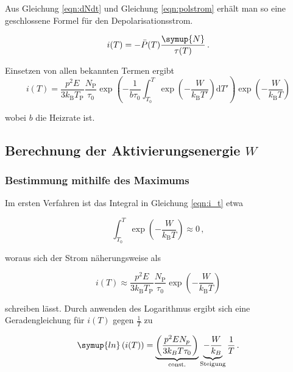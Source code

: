 Aus Gleichung \eqref{eqn:dNdt} und Gleichung \eqref{eqn:polstrom} erhält man so eine geschlossene Formel für den Depolarisationsstrom.

\begin{equation}
    i(T) = -\bar{P}(T) \frac{\symup{N}}{\tau(T)}\,.
\end{equation}

Einsetzen von allen bekannten Termen ergibt
\begin{equation}
    i(T) = \frac{ p^2 E }{ 3 k_\mathrm{B} T_\mathrm{P} } \frac{ N_\mathrm{P} }{ \tau_0 } \exp{ \left( - \frac{ 1 }{ b \tau_0 }
    \int_{T_0}^T \exp{ \left( - \frac{ W }{ k_\mathrm{B} T' } \right) \mathrm{d}T' } \right) } \exp{
    \left( -\frac{ W }{ k_\mathrm{B} T } \right) }
    \label{eqn:i_t}
\end{equation}

wobei $b$ die Heizrate ist.

\subsection{Berechnung der Aktivierungsenergie $W$}
\label{sub:W_A}
\subsubsection{Bestimmung mithilfe des Maximums}

Im ersten Verfahren ist das Integral in Gleichung \eqref{eqn:i_t} etwa

\begin{equation*}
    \int_{T_0}^T \exp{ \left( - \frac{ W }{ k_\mathrm{B} T } \right )} \approx 0 \,,
\end{equation*}

woraus sich der Strom näherungsweise als

\begin{equation}
    \label{eqn:approx}
    i(T) \approx \frac{ p^2 E }{ 3 k_\mathrm{B} T_\mathrm{P} } \frac{ N_\mathrm{P} }{ \tau_0 } \exp{ \left( - \frac{ W }{ k_\mathrm{B} T}
    \right ) }
\end{equation}

schreiben lässt.
Durch anwenden des Logarithmus ergibt sich eine Geradengleichung für $i(T)$ gegen $\frac{1}{T}$ zu

\begin{equation}
    \symup{ln}\left(i(T)\right) = \underbrace{\left(\frac{p^{2} E N_{p}}{3 k_{B} T \tau_{0}}\right)}_{\text{const.}} \underbrace{-\frac{W}{k_{B}}}_{\text{Steigung}} \frac{1}{T}\,.
\end{equation}

